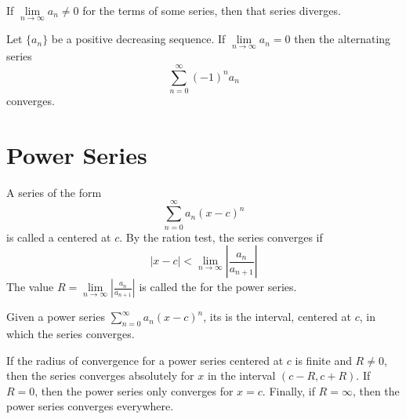 \documentclass[12pt, a4paper, oneside, openright, titlepage]{book}
\begin{document}

\begin{thm}
        If $\lim\limits_{n\rightarrow \infty}a_n \neq 0$ for the terms of some series, then that series diverges.
\end{thm}



\begin{thm}
        Let $\{a_n\}$ be a positive decreasing sequence. If $\lim\limits_{n\rightarrow \infty}a_n = 0$ then the alternating series \begin{equation}
                \sum\limits_{n=0}^{\infty}(-1)^na_n
        \end{equation}
        converges.
\end{thm}



\section{Power Series}


\begin{defn}
        A series of the form \begin{equation}
                \sum\limits_{n=0}^{\infty}a_n (x-c)^n
        \end{equation}
        is called a  centered at $c$. By the ration test, the series converges if \begin{equation}
                |x-c| < \lim\limits_{n\rightarrow \infty}\left|\frac{a_n}{a_{n+1}}\right|
        \end{equation}
        The value $R = \lim\limits_{n\rightarrow \infty}\left|\frac{a_n}{a_{n+1}}\right|$ is called the  for the power series.
\end{defn}



\begin{defn}
        Given a power series $\sum\limits_{n=0}^{\infty}a_n (x-c)^n$, its  is the interval, centered at $c$, in which the series converges.
\end{defn}




\begin{rmk}
        If the radius of convergence for a power series centered at $c$ is finite and $R \neq 0$, then the series converges absolutely for $x$ in the interval $(c - R, c + R)$. If $R = 0$, then the power series only converges for $x = c$. Finally, if $R = \infty$, then the power series converges everywhere.
\end{rmk}
\end{document}
